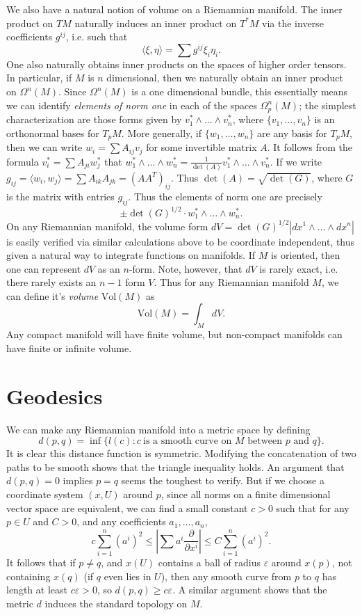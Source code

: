 We also have a natural notion of volume on a Riemannian manifold. The inner product on $TM$ naturally induces an inner product on $T^*M$ via the inverse coefficients $g^{ij}$, i.e. such that
%
\[ \langle \xi, \eta \rangle = \sum g^{ij} \xi_i \eta_i. \]
%
One also naturally obtains inner products on the spaces of higher order tensors. In particular, if $M$ is $n$ dimensional, then we naturally obtain an inner product on $\Omega^n(M)$. Since $\Omega^n(M)$ is a one dimensional bundle, this essentially means we can identify \emph{elements of norm one} in each of the spaces $\Omega^n_p(M)$; the simplest characterization are those forms given by $v_1^* \wedge \dots \wedge v_n^*$, where $\{ v_1,\dots,v_n \}$ is an orthonormal bases for $T_pM$. More generally, if $\{ w_1, \dots, w_n \}$ are any basis for $T_p M$, then we can write $w_i = \sum A_{ij} v_j$ for some invertible matrix $A$. It follows from the formula $v_i^* = \sum A_{ji} w_j^*$ that $w_1^* \wedge \dots \wedge w_n^* = \frac{1}{\det(A)} v_1^* \wedge \dots \wedge v_n^*$. If we write $g_{ij} = \langle w_i,w_j \rangle = \sum A_{ik} A_{jk} = (AA^T)_{ij}$. Thus $\det(A) = \sqrt{\det(G)}$, where $G$ is the matrix with entries $g_{ij}$. Thus the elements of norm one are precisely
%
\[ \pm \det(G)^{1/2} \cdot w_1^* \wedge \dots \wedge w_n^*. \]
%
On any Riemannian manifold, the volume form $dV = \det(G)^{1/2} |dx^1 \wedge \dots \wedge dx^n|$ is easily verified via similar calculations above to be coordinate independent, thus given a natural way to integrate functions on manifolds. If $M$ is oriented, then one can represent $dV$ as an $n$-form. Note, however, that $dV$ is rarely exact, i.e. there rarely exists an $n-1$ form $V$. Thus for any Riemannian manifold $M$, we can define it's \emph{volume} $\text{Vol}(M)$ as
%
\[ \text{Vol}(M) = \int_M dV. \]
%
Any compact manifold will have finite volume, but non-compact manifolds can have finite or infinite volume.

\section{Geodesics}

We can make any Riemannian manifold into a metric space by defining
%
\[ d(p,q) = \inf \{ l(c): c\ \text{is a smooth curve on $M$ between $p$ and $q$} \}. \]
%
It is clear this distance function is symmetric. Modifying the concatenation of two paths to be smooth shows that the triangle inequality holds. An argument that $d(p,q) = 0$ implies $p = q$ seems the toughest to verify. But if we choose a coordinate system $(x,U)$ around $p$, since all norms on a finite dimensional vector space are equivalent, we can find a small constant $c > 0$ such that for any $p \in U$ and $C > 0$, and any coefficients $a_1,\dots,a_n$,
%
\[ c \sum_{i = 1}^n (a^i)^2 \leq \left| \sum a^i \frac{\partial}{\partial x^i} \right| \leq C \sum_{i = 1}^n (a^i)^2. \]
%
It follows that if $p \neq q$, and $x(U)$ contains a ball of radius $\varepsilon$ around $x(p)$, not containing $x(q)$ (if $q$ even lies in $U$), then any smooth curve from $p$ to $q$ has length at least $c \varepsilon > 0$, so $d(p,q) \geq c \varepsilon$. A similar argument shows that the metric $d$ induces the standard topology on $M$.

